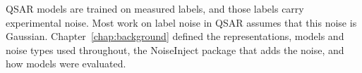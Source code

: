 
QSAR models are trained on measured labels, and those labels carry experimental noise. Most work on label noise in QSAR assumes that this noise is Gaussian. Chapter~\ref{chap:background} defined the representations, models and noise types used throughout, the NoiseInject package that adds the noise, and how models were evaluated.

